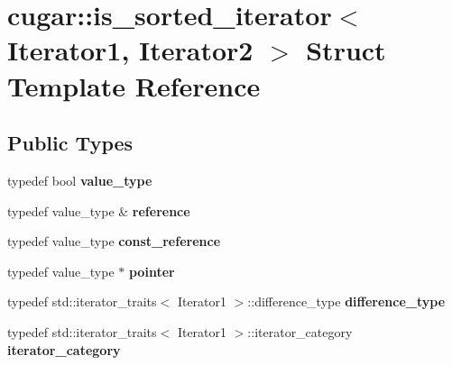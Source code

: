 \hypertarget{structcugar_1_1is__sorted__iterator}{}\section{cugar\+:\+:is\+\_\+sorted\+\_\+iterator$<$ Iterator1, Iterator2 $>$ Struct Template Reference}
\label{structcugar_1_1is__sorted__iterator}
\subsection*{Public Types}
\begin{DoxyCompactItemize}
\item 
\mbox{\label{structcugar_1_1is__sorted__iterator_a9add94d14413d3819f83d991c2202a99}} 
typedef bool {\bfseries value\+\_\+type}
\item 
\mbox{\label{structcugar_1_1is__sorted__iterator_ae4435daf6df3f57644ff7cc99564a67d}} 
typedef value\+\_\+type \& {\bfseries reference}
\item 
\mbox{\label{structcugar_1_1is__sorted__iterator_a4b0f7605bf8fd8eccf4920b848b6dab7}} 
typedef value\+\_\+type {\bfseries const\+\_\+reference}
\item 
\mbox{\label{structcugar_1_1is__sorted__iterator_a7415081aedfb462723a431a87bacc7e5}} 
typedef value\+\_\+type $\ast$ {\bfseries pointer}
\item 
\mbox{\label{structcugar_1_1is__sorted__iterator_ae0dcabc03e5d1658b133831841882e88}} 
typedef std\+::iterator\+\_\+traits$<$ Iterator1 $>$\+::difference\+\_\+type {\bfseries difference\+\_\+type}
\item 
\mbox{\label{structcugar_1_1is__sorted__iterator_a3e15e4ead4ecc7261d39f85bc42e4727}} 
typedef std\+::iterator\+\_\+traits$<$ Iterator1 $>$\+::iterator\+\_\+category {\bfseries iterator\+\_\+category}
\end{DoxyCompactItemize}
